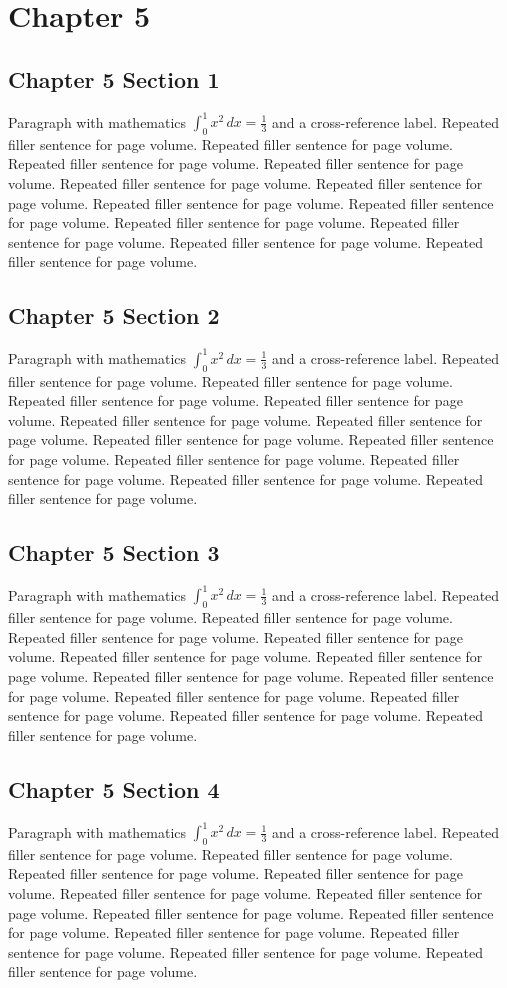 \documentclass[11pt]{report}
\begin{document}
\chapter{Chapter 5}
\section{Chapter 5 Section 1}
Paragraph with mathematics $\int_0^1 x^2\,dx = \frac13$ and a cross-reference label.
\label{sec:5:1}
Repeated filler sentence for page volume. Repeated filler sentence for page volume. Repeated filler sentence for page volume. Repeated filler sentence for page volume. Repeated filler sentence for page volume. Repeated filler sentence for page volume. Repeated filler sentence for page volume. Repeated filler sentence for page volume. Repeated filler sentence for page volume. Repeated filler sentence for page volume. Repeated filler sentence for page volume. Repeated filler sentence for page volume. 
\section{Chapter 5 Section 2}
Paragraph with mathematics $\int_0^1 x^2\,dx = \frac13$ and a cross-reference label.
\label{sec:5:2}
Repeated filler sentence for page volume. Repeated filler sentence for page volume. Repeated filler sentence for page volume. Repeated filler sentence for page volume. Repeated filler sentence for page volume. Repeated filler sentence for page volume. Repeated filler sentence for page volume. Repeated filler sentence for page volume. Repeated filler sentence for page volume. Repeated filler sentence for page volume. Repeated filler sentence for page volume. Repeated filler sentence for page volume. 
\section{Chapter 5 Section 3}
Paragraph with mathematics $\int_0^1 x^2\,dx = \frac13$ and a cross-reference label.
\label{sec:5:3}
Repeated filler sentence for page volume. Repeated filler sentence for page volume. Repeated filler sentence for page volume. Repeated filler sentence for page volume. Repeated filler sentence for page volume. Repeated filler sentence for page volume. Repeated filler sentence for page volume. Repeated filler sentence for page volume. Repeated filler sentence for page volume. Repeated filler sentence for page volume. Repeated filler sentence for page volume. Repeated filler sentence for page volume. 
\section{Chapter 5 Section 4}
Paragraph with mathematics $\int_0^1 x^2\,dx = \frac13$ and a cross-reference label.
\label{sec:5:4}
Repeated filler sentence for page volume. Repeated filler sentence for page volume. Repeated filler sentence for page volume. Repeated filler sentence for page volume. Repeated filler sentence for page volume. Repeated filler sentence for page volume. Repeated filler sentence for page volume. Repeated filler sentence for page volume. Repeated filler sentence for page volume. Repeated filler sentence for page volume. Repeated filler sentence for page volume. Repeated filler sentence for page volume. 
\end{document}
